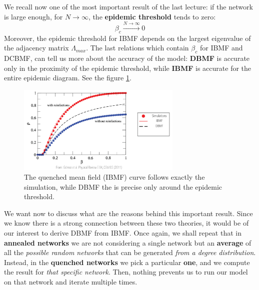 \documentclass[../main/main.tex]{subfiles}
\begin{document}

We recall now one of the most important result of the last lecture: if the network is large enough, for \( N \rightarrow \infty  \), the \textbf{epidemic threshold} tends to zero:
\begin{equation}
    \beta_c \xrightarrow{N \to \infty} 0
\end{equation}
Moreover, the epidemic threshold for IBMF depends on the largest eigenvalue of the adjacency matrix $\Lambda_{max}$.
The last relations which contain \( \beta _c \) for IBMF and DCBMF, can tell us more about the accuracy of the model: \textbf{DBMF} is accurate only in the proximity of the epidemic threshold, while \textbf{IBMF} is accurate for the entire epidemic diagram. See the figure \ref{fig:09_1}. 

\begin{figure}[h!]
\centering
\includegraphics[width=0.7\textwidth]{../lessons/image/09/image01.png}
\caption{\label{fig:09_1} The quenched mean field (IBMF) curve follows exactly the simulation, while DBMF the is precise only around the epidemic threshold.}
\end{figure}

We want now to discuss what are the reasons behind this important result. Since we know there is a strong connection between these two theories, it would be of our interest to derive DBMF from IBMF. Once again, we shall repeat that in \textbf{annealed networks} we are not considering a single network but an \textbf{average} of all the \textit{possible random networks} that can be generated \textit{from a degree distribution}. Instead, in the \textbf{quenched networks} we pick a particular \textbf{one}, and we compute the result for \textit{that specific network}. Then, nothing prevents us to run our model on that network and iterate multiple times.
\end{document}
